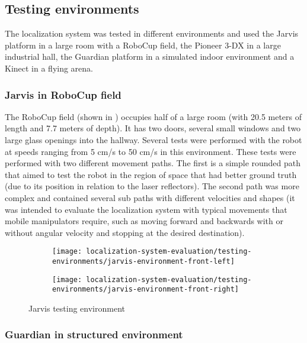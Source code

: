 \subsection{Testing environments}

The localization system was tested in different environments and used the Jarvis platform in a large room with a RoboCup field, the Pioneer 3-DX in a large industrial hall, the Guardian platform in a simulated indoor environment and a Kinect in a flying arena.


\subsubsection{Jarvis in RoboCup field}

The RoboCup field (shown in ) occupies half of a large room (with 20.5 meters of length and 7.7 meters of depth). It has two doors, several small windows and two large glass openings into the hallway. Several tests were performed with the robot at speeds ranging from 5 cm/s to 50 cm/s in this environment. These tests were performed with two different movement paths. The first is a simple rounded path that aimed to test the robot in the region of space that had better ground truth (due to its position in relation to the laser reflectors). The second path was more complex and contained several sub paths with different velocities and shapes (it was intended to evaluate the localization system with typical movements that mobile manipulators require, such as moving forward and backwards with or without angular velocity and stopping at the desired destination).


\begin{figure}[H]
	\centering
	\begin{subfigure}[ht]{0.45\textwidth}
		\centering
		\texttt{[image: localization-system-evaluation/testing-environments/jarvis-environment-front-left]}
	\end{subfigure}
	\begin{subfigure}[ht]{0.45\textwidth}
		\centering
		\texttt{[image: localization-system-evaluation/testing-environments/jarvis-environment-front-right]}
	\end{subfigure}
	\caption{Jarvis testing environment}
	\label{fig:localization-system-evaluation_jarvis-tests-environment}
\end{figure}


\subsubsection{Guardian in structured environment}

